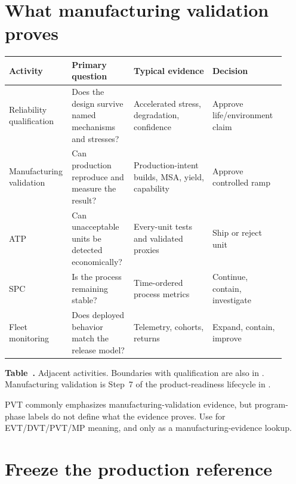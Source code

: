\section{What manufacturing validation proves}
\label{sec:mfg-vs-adjacent}

\begin{table}[ht]
\label{tab:mfg-vs-adjacent}%
\centering
\setlength{\tabcolsep}{3pt}%
\footnotesize
\renewcommand{\arraystretch}{1.2}%
\begin{tabular}{@{}p{0.16\linewidth}p{0.22\linewidth}p{0.28\linewidth}p{0.26\linewidth}@{}}
\toprule
Activity & Primary question & Typical evidence & Decision \\
\midrule
Reliability qualification & Does the design survive named mechanisms and stresses? & Accelerated stress, degradation, confidence & Approve life/environment claim \\
\addlinespace[0.8em]
Manufacturing validation & Can production reproduce and measure the result? & Production-intent builds, MSA, yield, capability & Approve controlled ramp \\
\addlinespace[0.8em]
ATP & Can unacceptable units be detected economically? & Every-unit tests and validated proxies & Ship or reject unit \\
\addlinespace[0.8em]
SPC & Is the process remaining stable? & Time-ordered process metrics & Continue, contain, investigate \\
\addlinespace[0.8em]
Fleet monitoring & Does deployed behavior match the release model? & Telemetry, cohorts, returns & Expand, contain, improve \\
\bottomrule
\end{tabular}
\par\medskip
{\raggedright\footnotesize\textbf{Table~\thetable.} Adjacent activities.
Boundaries with qualification are also in . Manufacturing
validation is Step~7 of the product-readiness lifecycle in
.\par}
\end{table}
\FloatBarrier

PVT commonly emphasizes manufacturing-validation evidence, but program-phase
labels do not define what the evidence proves. Use
 for EVT/DVT/PVT/MP meaning, and
 only as a manufacturing-evidence lookup.

\section{Freeze the production reference}
\label{sec:mfg-production-reference}

